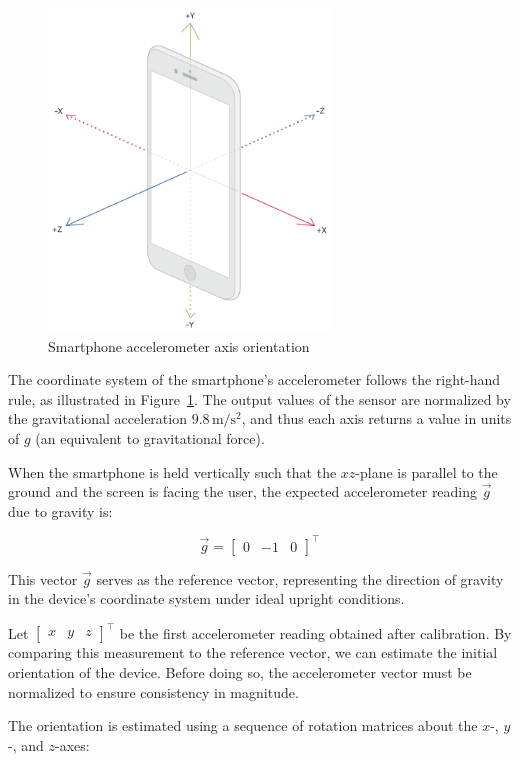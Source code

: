 \documentclass{article}
\begin{document}
\FloatBarrier
\begin{figure}[h]
    \centering
    \includegraphics[width=7.5cm]{Images/accelerometer.png}
    \caption{Smartphone accelerometer axis orientation}
    \label{fig:accelerometer}
\end{figure}

The coordinate system of the smartphone's accelerometer follows the right-hand rule, as illustrated in Figure~\ref{fig:accelerometer}. The output values of the sensor are normalized by the gravitational acceleration $9.8\,\mathrm{m/s^2}$, and thus each axis returns a value in units of $g$ (an equivalent to gravitational force).

When the smartphone is held vertically such that the $xz$-plane is parallel to the ground and the screen is facing the user, the expected accelerometer reading $ \vec{g}$ due to gravity is:

\[
 \vec{g} = \begin{bmatrix} 0 & -1 & 0 \end{bmatrix}^\top
\]

This vector $ \vec{g}$ serves as the reference vector, representing the direction of gravity in the device's coordinate system under ideal upright conditions.

Let $\begin{bmatrix}x&y&z\end{bmatrix}^\top$ be the first accelerometer reading obtained after calibration. By comparing this measurement to the reference vector, we can estimate the initial orientation of the device. Before doing so, the accelerometer vector must be normalized to ensure consistency in magnitude.

The orientation is estimated using a sequence of rotation matrices about the $x$-, $y$-, and $z$-axes:
\end{document}

